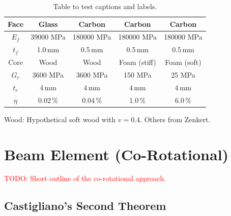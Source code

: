 \begin{table}[h!]
\centering
\begin{tabular}{| c | c c c c |}
\hline
Face & Glass & Carbon & Carbon & Carbon \\
\hline
$E_f$ & 39000 MPa & 180000 MPa & 180000 MPa & 180000 MPa \\
$t_f$ & 1.0\,\unit{mm} & 0.5\,\unit{mm} & 0.5\,\unit{mm} & 0.5\,\unit{mm} \\
\hline
Core & Wood & Wood & Foam (stiff) & Foam (soft) \\
\hline
$G_c$ & 3600 MPa & 3600 MPa & 150 MPa & 25 MPa \\
$t_c$ & 4\,\unit{mm} & 4\,\unit{mm} & 4\,\unit{mm} & 4\,\unit{mm} \\
\hline
$\eta$ & 0.02\,\% & 0.04\,\% & 1.0\,\% & 6.0\,\% \\
\hline
\end{tabular}
\caption{Table to test captions and labels.}
\label{tbl:material-shear-ratio}
\end{table}

Wood: Hypothetical soft wood with $v = 0.4$. Others from Zenkert.

%
%	
%	
%	
%	
%	
%	
%	
%	


\newpage
\section{Beam Element (Co-Rotational)}

\textcolor{red}{TODO: Short outline of the co-rotational approach.}

\newpage
\subsection{Castigliano's Second Theorem}

